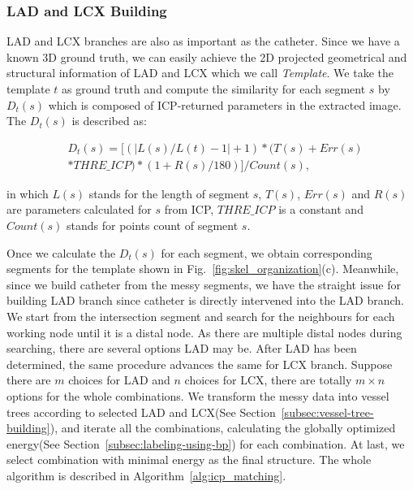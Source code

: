 \documentclass[journal]{IEEEtran}
\begin{document}
\subsubsection{\textbf{LAD and LCX Building}}
LAD and LCX branches are also as important as the catheter. Since we have a known 3D ground truth, we can easily achieve the 2D projected geometrical and structural information of LAD and LCX which we call \textit{Template}. We take the template $t$ as ground truth and compute the similarity for each segment $s$ by $D_t(s)$ which is composed of ICP-returned parameters in the extracted image. The $D_t(s)$ is described as:

\begin{equation}
\begin{split}
&D_t(s) = [(|L(s)/L(t)-1|+1)*(T(s)+Err(s)\\
&*THRE\_ICP)*(1+R(s)/180)]/Count(s),
\end{split}
\end{equation}

in which $L(s)$ stands for the length of segment $s$, $T(s)$, $Err(s)$ and $R(s)$ are parameters calculated for $s$ from ICP, $THRE\_ICP$ is a constant and $Count(s)$ stands for points count of segment $s$.

Once we calculate the $D_t(s)$ for each segment, we obtain corresponding segments for the template shown in Fig.~\ref{fig:skel_organization}(c). Meanwhile, since we build catheter from the messy segments, we have the straight issue for building LAD branch since catheter is directly intervened into the LAD branch. We start from the intersection segment and search for the neighbours for each working node until it is a distal node. As there are multiple distal nodes during searching, there are several options LAD may be. After LAD has been determined, the same procedure advances the same for LCX branch. Suppose there are $m$ choices for LAD and $n$ choices for LCX, there are totally $m \times n$ options for the whole combinations. We transform the messy data into vessel trees according to selected LAD and LCX(See Section~\ref{subsec:vessel-tree-building}), and iterate all the combinations, calculating the globally optimized energy(See Section~\ref{subsec:labeling-using-bp}) for each combination. At last, we select combination with minimal energy as the final structure. The whole algorithm is described in Algorithm~\ref{alg:icp_matching}.
\end{document}
